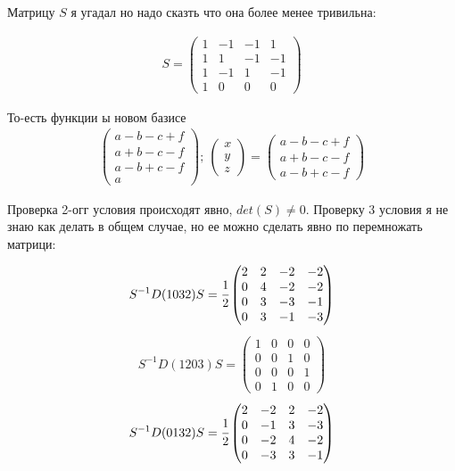Матрицу $S$ я угадал но надо сказть что она более менее тривильна:

\begin{gather}
    S = 
    \begin{pmatrix}
        1& -1& -1& 1\\
        1& 1& -1& -1\\
        1& -1& 1& -1\\
        1& 0& 0& 0
    \end{pmatrix}
\end{gather}

То-есть функции ы новом базисе
\begin{gather}
    \begin{pmatrix}
        a - b - c + f\\ a + b - c - f\\ a - b + c - f\\ a
    \end{pmatrix}
    ; \
    \begin{pmatrix}
        x\\ y\\ z
    \end{pmatrix}
    =
    \begin{pmatrix}
        a - b - c + f\\ a + b - c - f\\ a - b + c - f
    \end{pmatrix}
\end{gather}


Проверка 2-огг условия происходят явно, $det(S) \neq 0$. Проверку 3 условия я не знаю как делать в общем случае,
но ее можно сделать явно по перемножать матрици:

\begin{gather}
    S^{-1}D(1032)S = 
    \cfrac{1}{2} 
    \begin{pmatrix}
        2& 2& -2& -2\\
        0& 4& -2& -2\\
        0& 3& -3& -1\\
        0& 3& -1& -3
    \end{pmatrix}
\end{gather}
\begin{gather}
    S^{-1}D(1203)S = 
    \begin{pmatrix}
        1& 0& 0& 0\\
        0& 0& 1& 0\\
        0& 0& 0& 1\\
        0& 1& 0& 0
    \end{pmatrix}
\end{gather}
\begin{gather}
    S^{-1}D(0132)S =
    \cfrac{1}{2}
    \begin{pmatrix}
        2& -2& 2& -2\\
        0& -1& 3& -3\\
        0& -2& 4& -2\\
        0& -3& 3& -1
    \end{pmatrix}
\end{gather}

